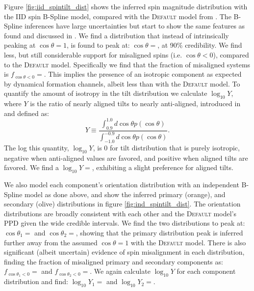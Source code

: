 Figure \ref{fig:iid_spintilt_dist} shows the inferred spin magnitude distribution with the IID spin B-Spline model, compared with the \textsc{Default} model from \citet{o3b_astro_dist}. 
The B-Spline inferences have large uncertainties but start to show the same features as found and discussed in \citet{spinitasyoulike}. 
We find a distribution that instead of intrinsically peaking at $\cos{\theta}=1$, is found to peak at: $\cos{\theta}=$\result{$\CIPlusMinus{\macros[BSplineIIDCompSpins][peakCosTilt]}$}, at 
90\% credibility. We find less, but still considerable support for misaligned spins (i.e. $\cos{\theta}<0$), compared to the \textsc{Default} model. Specifically we 
find that the fraction of misaligned systems is $f_{\cos{\theta}<0}=$\result{$\CIPlusMinus{\macros[BSplineIIDCompSpins][negFrac]}$}. This implies 
the presence of an isotropic component as expected by dynamical formation channels, albeit less than with the \textsc{Default} model. To quantify the 
amount of isotropy in the tilt distribution we calculate $\log_{10}Y$, where $Y$ is the ratio of nearly aligned tilts to nearly anti-aligned, 
introduced in \citet{spinitasyoulike} and defined as:
\begin{equation}
    Y \equiv \frac{\int_{0.9}^{1.0} d\cos{\theta} p(\cos{\theta})}{\int_{-1.0}^{-0.9} d\cos{\theta} p(\cos{\theta})}.
\end{equation}
The log this quantity, $\log_{10}Y$, is 0 for tilt distribution that is purely isotropic, negative when anti-aligned values are favored, 
and positive when aligned tilts are favored. We find a $\log_{10}Y=$, exhibiting a slight preference for aligned tilts.  

We also model each component's orientation distribution with an independent B-Spline model as done above, and show the inferred 
primary (orange), and secondary (olive) distributions in figure \ref{fig:ind_spintilt_dist}. The orientation distributions are broadly
consistent with each other and the \textsc{Default} model's PPD given the wide credible intervals. We find the two distributions to peak at: $\cos{\theta_1}=$\result{$\CIPlusMinus{\macros[BSplineIndependentCompSpins][peakCosTilt1]}$} 
and $\cos{\theta_2}=$\result{$\CIPlusMinus{\macros[BSplineIndependentCompSpins][peakCosTilt2]}$}, showing that the primary distribution peak is inferred further away 
from the assumed $\cos{\theta}=1$ with the \textsc{Default} model. There is also significant (albeit uncertain) evidence of spin misalignment in each distribution, finding 
the fraction of misaligned primary and secondary components as: $f_{\cos{\theta_1}<0}=$\result{$\CIPlusMinus{\macros[BSplineIndependentCompSpins][negFrac1]}$} and 
$f_{\cos{\theta_2}<0}=$\result{$\CIPlusMinus{\macros[BSplineIndependentCompSpins][negFrac2]}$}. We again calculate $\log_{10}Y$  
for each component distribution and find: $\log_{10}Y_1=$ and 
$\log_{10}Y_2=$.


